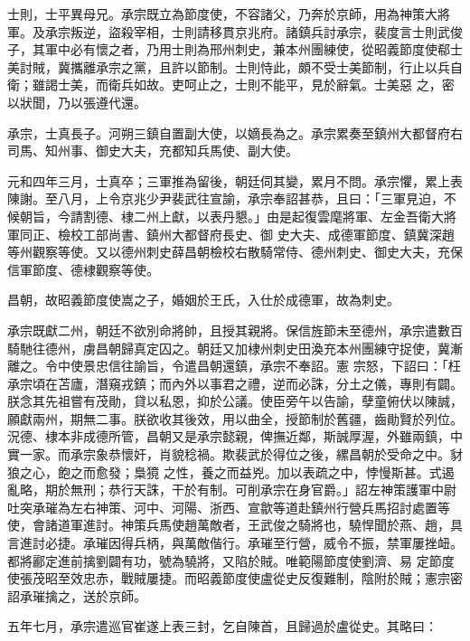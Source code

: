 \begin{pinyinscope}
 士則，士平異母兄。承宗既立為節度使，不容諸父，乃奔於京師，用為神策大將軍。及承宗叛逆，盜殺宰相，士則請移貫京兆府。諸鎮兵討承宗，裴度言士則武俊子，其軍中必有懷之者，乃用士則為邢州刺史，兼本州團練使，從昭義節度使郗士美討賊，冀攜離承宗之黨，且許以節制。士則恃此，頗不受士美節制，行止以兵自衛；雖謁士美，而衛兵如故。吏呵止之，士則不能平，見於辭氣。士美惡
 之，密以狀聞，乃以張遵代還。



 承宗，士真長子。河朔三鎮自置副大使，以嫡長為之。承宗累奏至鎮州大都督府右司馬、知州事、御史大夫，充都知兵馬使、副大使。



 元和四年三月，士真卒；三軍推為留後，朝廷伺其變，累月不問。承宗懼，累上表陳謝。至八月，上令京兆少尹裴武往宣諭，承宗奉詔甚恭，且曰：「三軍見迫，不候朝旨，今請割德、棣二州上獻，以表丹懇。」由是起復雲麾將軍、左金吾衛大將軍同正、檢校工部尚書、鎮州大都督府長史、御
 史大夫、成德軍節度、鎮冀深趙等州觀察等使。又以德州刺史薛昌朝檢校右散騎常侍、德州刺史、御史大夫，充保信軍節度、德棣觀察等使。



 昌朝，故昭義節度使嵩之子，婚姻於王氏，入仕於成德軍，故為刺史。



 承宗既獻二州，朝廷不欲別命將帥，且授其親將。保信旌節未至德州，承宗遣數百騎馳往德州，虜昌朝歸真定囚之。朝廷又加棣州刺史田渙充本州團練守捉使，冀漸離之。令中使景忠信往諭旨，令遣昌朝還鎮，承宗不奉詔。憲
 宗怒，下詔曰：「枉承宗頃在苫廬，潛窺戎鎮；而內外以事君之禮，逆而必誅，分土之儀，專則有闢。朕念其先祖嘗有茂勛，貸以私恩，抑於公議。使臣旁午以告諭，孽童俯伏以陳誠，願獻兩州，期無二事。朕欲收其後效，用以曲全，授節制於舊疆，齒勛賢於列位。況德、棣本非成德所管，昌朝又是承宗懿親，俾撫近鄰，斯誠厚渥，外雖兩鎮，中實一家。而承宗象恭懷奸，肖貌稔禍。欺裴武於得位之後，縲昌朝於受命之中。豺狼之心，飽之而愈發；梟獍
 之性，養之而益兇。加以表疏之中，悖慢斯甚。式遏亂略，期於無刑；恭行天誅，干於有制。可削承宗在身官爵。」詔左神策護軍中尉吐突承璀為左右神策、河中、河陽、浙西、宣歙等道赴鎮州行營兵馬招討處置等使，會諸道軍進討。神策兵馬使趙萬敵者，王武俊之騎將也，驍悍聞於燕、趙，具言進討必捷。承璀因得兵柄，與萬敵偕行。承璀至行營，威令不振，禁軍屢挫衄。都將酈定進前擒劉闢有功，號為驍將，又陷於賊。唯範陽節度使劉濟、易
 定節度使張茂昭至效忠赤，戰賊屢捷。而昭義節度使盧從史反復難制，陰附於賊；憲宗密詔承璀擒之，送於京師。



 五年七月，承宗遣巡官崔遂上表三封，乞自陳首，且歸過於盧從史。其略曰：




\end{pinyinscope}
